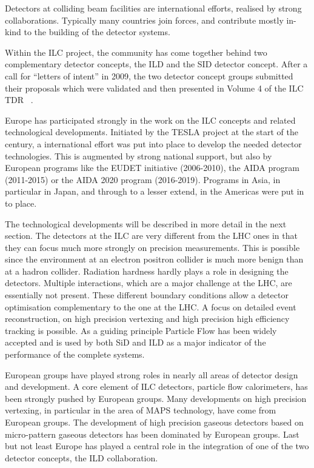 \documentclass[%
 reprint,
 amsmath,amssymb,
 aps,
]{revtex4-1}
\begin{document}
Detectors at colliding beam facilities are international efforts, realised by strong collaborations. Typically many countries join forces, and contribute mostly in-kind to the building of the detector systems. 

Within the ILC project, the community has come together behind two complementary detector concepts, the ILD and the SID detector concept. After a call for ``letters of intent'' in 2009, the two detector concept groups submitted their proposals which were validated and then presented in Volume 4 of the ILC TDR ~\cite{ILC-TDR}.

Europe has participated strongly in the work on the ILC concepts and related technological developments. Initiated by the TESLA project at the start of the century, a international effort was put into place to develop the needed detector technologies. This is augmented by strong national support, but also by European programs like the EUDET initiative (2006-2010), the AIDA program (2011-2015) or the AIDA 2020 program (2016-2019). Programs in Asia, in particular in Japan, and through to a lesser extend, in the Americas were put in to place. 

The technological developments will be described in more detail in the next section. The detectors at the ILC are very different from the LHC ones in that they can focus much more strongly on precision measurements. This is possible since the environment at an electron positron collider is much more benign than at a hadron collider. Radiation hardness hardly plays a role in designing the detectors. Multiple interactions, which are a major challenge at the LHC, are essentially not present. These different boundary conditions allow a detector optimisation complementary to the one at the LHC. A focus on detailed event reconstruction, on high precision vertexing and high precision high efficiency tracking is possible. As a guiding principle Particle Flow has been widely accepted and is used by both SiD and ILD as a major indicator of the performance of the complete systems. 

European groups have played strong roles in nearly all areas of detector design and development. A core element of ILC detectors, particle flow calorimeters, has been strongly pushed by European groups. Many developments on high precision vertexing, in particular in the area of MAPS technology, have come from European groups. The development of high precision gaseous detectors based on micro-pattern gaseous detectors has been dominated by European groups. Last but not least Europe has played a central role in the integration of one of the two detector concepts, the ILD collaboration.  
\end{document}

